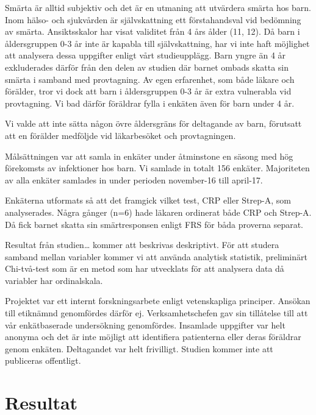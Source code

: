 \documentclass{nature}
\begin{document}
Sm\"arta \"ar alltid subjektiv och det \"ar en utmaning att utv\"ardera sm\"arta hos barn.
Inom h\"also- och sjukv\r{a}rden \"ar sj\"alvskattning ett f\"orstahandsval vid bed\"omning av
sm\"arta. Ansiktsskalor har visat validitet fr\r{a}n 4 \r{a}rs \r{a}lder (11, 12). D\r{a} barn i
\r{a}ldersgruppen 0-3 \r{a}r inte \"ar kapabla till sj\"alvskattning, har vi inte haft
m\"ojlighet att analysera dessa uppgifter enligt v\r{a}rt studieuppl\"agg. Barn yngre \"an
4 \r{a}r exkluderades d\"arf\"or fr\r{a}n den delen av studien d\"ar barnet ombads skatta sin
sm\"arta i samband med provtagning. Av egen erfarenhet, som b\r{a}de l\"akare och
f\"or\"alder, tror vi dock att barn i \r{a}ldersgruppen 0-3 \r{a}r \"ar extra vulnerabla vid
provtagning. Vi bad d\"arf\"or f\"or\"aldrar fylla i enk\"aten \"aven f\"or barn under 4 \r{a}r.

Vi valde att inte s\"atta n\r{a}gon \"ovre \r{a}ldersgr\"ans f\"or deltagande av barn, f\"orutsatt
att en f\"or\"alder medf\"oljde vid l\"akarbes\"oket och provtagningen.

M\r{a}ls\"attningen var att samla in enk\"ater under \r{a}tminstone en s\"asong med h\"og
f\"orekomsts av infektioner hos barn. Vi samlade in totalt 156 enk\"ater.
Majoriteten av alla enk\"ater samlades in under perioden november-16 till
april-17.

Enk\"aterna utformats s\r{a} att det framgick vilket test, CRP eller Strep-A, som
analyserades. N\r{a}gra g\r{a}nger (n=6) hade l\"akaren ordinerat b\r{a}de CRP och Strep-A. D\r{a}
fick barnet skatta sin sm\"artresponsen enligt FRS f\"or b\r{a}da proverna separat.

Resultat fr\r{a}n studien… kommer att beskrivas deskriptivt. F\"or att studera samband
mellan variabler kommer vi att anv\"anda analytisk statistik, prelimin\"art
Chi-tv\r{a}-test som \"ar en metod som har utvecklats f\"or att analysera data d\r{a}
variabler har ordinalskala.

Projektet var ett internt forskningsarbete enligt vetenskapliga principer.
Ans\"okan till etikn\"amnd genomf\"ordes d\"arf\"or ej. Verksamhetschefen gav sin
till\r{a}telse till att v\r{a}r enk\"atbaserade unders\"okning genomf\"ordes. Insamlade
uppgifter var helt anonyma och det \"ar inte m\"ojligt att identifiera patienterna
eller deras f\"or\"aldrar genom enk\"aten. Deltagandet var helt frivilligt. Studien
kommer inte att publiceras offentligt.

\section{Resultat}
\end{document}
